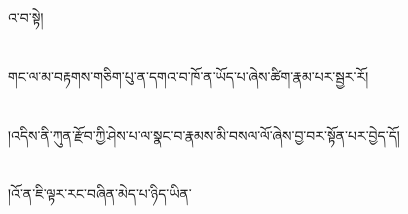 འ་བ་སྟེ།\chapter{ }གང་ལ་མ་བརྟགས་གཅིག་པུ་ན་དགའ་བ་ཁོ་ན་ཡོད་པ་ཞེས་ཚིག་རྣམ་པར་སྦྱར་རོ།\chapter{ }།འདིས་ནི་ཀུན་རྫོབ་ཀྱི་ཤེས་པ་ལ་སྣང་བ་རྣམས་མི་བསལ་ལོ་ཞེས་བྱ་བར་སྟོན་པར་བྱེད་དོ།\chapter{ }།འོ་ན་ཇི་ལྟར་རང་བཞིན་མེད་པ་ཉིད་ཡིན་